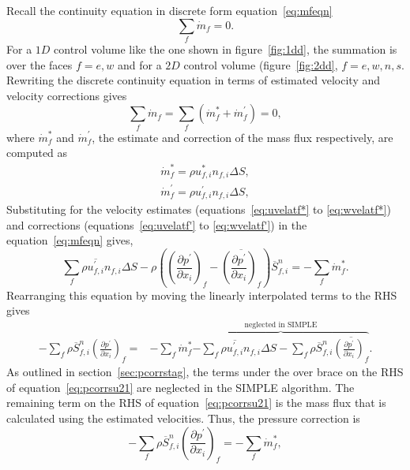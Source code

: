 \noindent
Recall the continuity equation in discrete form equation~\ref{eq:mfeqn} 
\begin{equation*}
\sum_{f} \dot{m}_f = 0.
\end{equation*}
For a $1D$ control volume like the one shown in figure~\ref{fig:1dd}, the summation is over the faces $f=e,w$ and for a $2D$ control volume (figure~\ref{fig:2dd}, $f=e,w,n,s$.
Rewriting the discrete continuity equation in terms of estimated velocity and velocity corrections gives
\begin{equation}
\sum_{f}\dot{m}_{f}=\sum_{f}(\dot{m}_{f}^{\ast}+\dot{m}_{f}^{\prime})=0,
\end{equation}
where $\dot{m}^{\ast}_f$ and $\dot{m}^{\prime}_f$, the estimate and correction of the mass flux respectively, are computed as 
\begin{align*}
\dot{m}^{\ast}_f = \rho u_{f,i}^{\ast} n_{f,i} \Delta S,\\
\dot{m}^{\prime}_f = \rho u_{f,i}^{\prime} n_{f,i} \Delta S,
\end{align*}
Substituting for the velocity estimates (equations~\ref{eq:uvelatf*} to \ref{eq:wvelatf*}) and corrections (equations~\ref{eq:uvelatf'} to \ref{eq:wvelatf'}) in the equation~\ref{eq:mfeqn} gives,
\begin{equation}
\sum_{f}\rho\overline{u_{f,i}^{\prime}}n_{f,i}\Delta S-\rho\left(\left(\frac{\partial p^{\prime}}{\partial x_i}\right)_f-\overline{\left(\frac{\partial p^{\prime}}{\partial x_i}\right)_f}\right)\overline{S}_{f,i}^{n}=-\sum_{f}\dot{m}_{f}^{\ast}.
\end{equation}
Rearranging this equation by moving the linearly interpolated terms to the RHS gives
\begin{align}
-\sum_{f}\rho\overline{S}_{f,i}^{n}\left(\frac{\partial p^{\prime}}{\partial x_i}\right)_{f}=&-\sum_{f}\dot{m}_{f}^{\ast} \overbrace{-\sum_{f}\rho\overline{u_{f,i}^{\prime}}n_{f,i}\Delta S-\sum_{f}\rho\overline{S}_{f,i}^{n}\overline{\left(\frac{\partial p^{\prime}}{\partial x_i}\right)_{f}}}^{\text{neglected in SIMPLE}}.\label{eq:pcorrsu21} 
\end{align}
As outlined in section~\ref{sec:pcorrstag}, the terms under the over brace on the RHS of equation~\ref{eq:pcorrsu21} are neglected in the SIMPLE algorithm. The remaining term on the RHS of equation~\ref{eq:pcorrsu21} is the mass flux that is calculated using the estimated velocities. Thus, the pressure correction is
\begin{equation}
-\sum_{f}\rho\overline{S}_{f,i}^{n}\left(\frac{\partial p^{\prime}}{\partial x_i}\right)_{f}=-\sum_{f}\dot{m}_{f}^{\ast},
\label{eq:pcorreq}
\end{equation}

